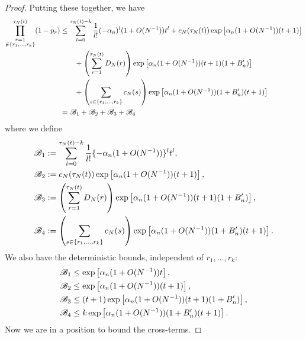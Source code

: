 \documentclass{article}
\newcommand{\1}[1]{\mathbbm{1}_{#1}}
\begin{document}
\begin{proof}
Putting these together, we have
\begin{align}
\prod_{\substack{r=1 \\ \notin \{r_1,\dots,r_k\} }}^{\tau_N(t)} (1-p_r)
&\leq \sum_{l=0}^{\tau_N(t) -k} \frac{1}{l!} (-\alpha_n)^l (1+O(N^{-1})) t^l
+ c_N(\tau_N(t)) \exp\left[ \alpha_n (1+O(N^{-1})) (t+1) \right] \notag\\
&\qquad+ \left( \sum_{r=1}^{\tau_N(t)} D_N(r) \right) \exp\left[ \alpha_n (1+O(N^{-1})) (t+1) (1+B_n^\prime) \right] \notag\\
&\qquad+ \left( \sum_{s\in \{r_1,\dots,r_k\} } c_N(s) \right)
\exp\left[\alpha_n (1+O(N^{-1})) (1 + B_n^\prime)(t+1) \right] \notag\\
&= \mathscr{B}_1 + \mathscr{B}_2 + \mathscr{B}_3 + \mathscr{B}_4
\end{align}
where we define
\begin{align}
\mathscr{B}_1 &:= \sum_{l=0}^{\tau_N(t) -k} \frac{1}{l!} \{ - \alpha_n (1+O(N^{-1})) \}^l t^l , \notag\\
\mathscr{B}_2 &:= c_N(\tau_N(t)) \exp\left[ \alpha_n (1+O(N^{-1})) (t+1) \right] , \notag\\
\mathscr{B}_3 &:= \left( \sum_{r=1}^{\tau_N(t)} D_N(r) \right) \exp\left[ \alpha_n (1+O(N^{-1})) (t+1) (1+B_n^\prime) \right] , \notag\\
\mathscr{B}_4 &:= \left( \sum_{s\in \{r_1,\dots,r_k\} } c_N(s) \right)
\exp\left[\alpha_n (1+O(N^{-1})) (1 + B_n^\prime)(t+1) \right] . \label{eq:106}
\end{align}
We also have the deterministic bounds, independent of $r_1,\dots,r_k$:
\begin{align}
\mathscr{B}_1 &\leq \exp\left[ \alpha_n (1+O(N^{-1})) t \right] , \notag\\
\mathscr{B}_2 &\leq \exp\left[ \alpha_n (1+O(N^{-1})) (t+1) \right] , \notag\\
\mathscr{B}_3 &\leq (t+1) \exp\left[ \alpha_n (1+O(N^{-1})) (t+1) (1+B_n^\prime) \right] , \notag\\
\mathscr{B}_4 &\leq k \exp\left[\alpha_n (1+O(N^{-1})) (1 + B_n^\prime)(t+1) \right] . \label{eq:107}
\end{align}
Now we are in a position to bound the cross-terms.


\end{proof}
\end{document}
